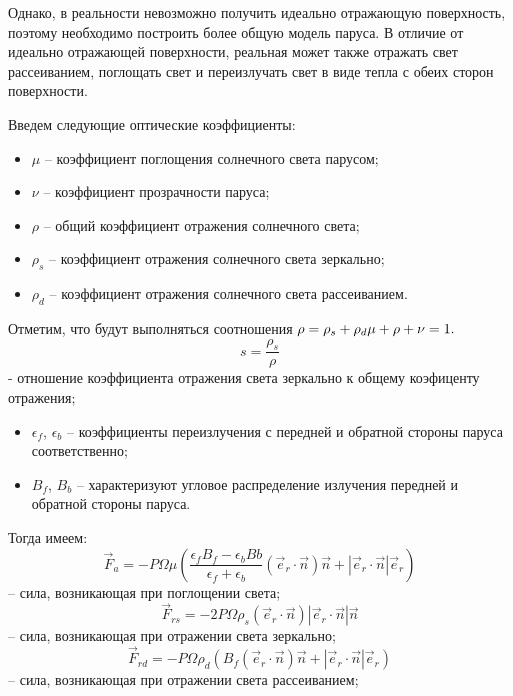 \documentclass[tikz, a4paper,12pt]{extreport}
\begin{document}
  Однако, в реальности невозможно получить идеально отражающую поверхность, поэтому
  необходимо построить более общую модель паруса. В отличие от идеально отражающей
  поверхности, реальная может также отражать свет рассеиванием, поглощать свет и переизлучать
  свет в виде тепла с обеих сторон поверхности.\par
  Введем следующие оптические коэффициенты:
  \begin{itemize}
    \item $\mu$ -- коэффициент поглощения солнечного света парусом;
    \item $\nu$ -- коэффициент прозрачности паруса;
    \item $\rho$ -- общий коэффициент отражения солнечного света;
    \item $\rho_s$ -- коэффициент отражения солнечного света зеркально;
    \item $\rho_d$ -- коэффициент отражения солнечного света рассеиванием.
  \end{itemize}\par
  Отметим, что будут выполняться соотношения
  $
    \rho = \rho_s + \rho_d \\
    \mu + \rho + \nu = 1.
  $
  \begin{equation}
    s = \frac{\rho_s}{\rho}
  \end{equation}
  - отношение коэффициента отражения света зеркально к общему коэфиценту отражения;
  \begin{itemize}[label={}]
    \item $\epsilon_f$, $\epsilon_b$ -- коэффициенты переизлучения с передней и
    обратной стороны паруса соответственно;
    \item $B_f$, $B_b$ -- характеризуют угловое распределение излучения передней
    и обратной стороны паруса.
  \end{itemize}\par
  Тогда имеем:
  \begin{equation}
    \vec{F}_a = -P\Omega\mu\left(\frac{\epsilon_f B_f - \epsilon_b Bb}{\epsilon_f + \epsilon_b}(\vec{e}_r \cdot \vec{n})\vec{n} + |\vec{e}_r \cdot \vec{n}|\vec{e}_r\right)
  \end{equation}
  -- сила, возникающая при поглощении света;
  \begin{equation}
    \vec{F}_{rs} = -2P\Omega\rho_s(\vec{e}_r \cdot \vec{n})|\vec{e}_r \cdot \vec{n}|\vec{n}
  \end{equation}
  -- сила, возникающая при отражении света зеркально;
  \begin{equation}
    \vec{F}_{rd} = -P\Omega\rho_d\left(B_f(\vec{e}_r \cdot \vec{n})\vec{n} + |\vec{e}_r \cdot \vec{n}|\vec{e}_r\right)
  \end{equation}
  -- сила, возникающая при отражении света рассеиванием;
\end{document}
